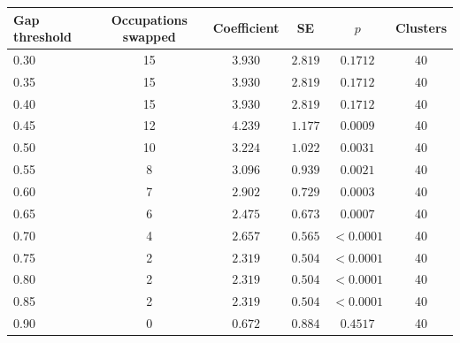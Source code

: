 \begin{tabular}{lccccc}
\toprule
Gap threshold & Occupations swapped & Coefficient & SE & $p$ & Clusters \\
\midrule
0.30 & 15 & $3.930$ & $2.819$ & $0.1712$ & 40 \\
0.35 & 15 & $3.930$ & $2.819$ & $0.1712$ & 40 \\
0.40 & 15 & $3.930$ & $2.819$ & $0.1712$ & 40 \\
0.45 & 12 & $4.239$\sym{***} & $1.177$ & $0.0009$ & 40 \\
0.50 & 10 & $3.224$\sym{**} & $1.022$ & $0.0031$ & 40 \\
0.55 & 8 & $3.096$\sym{**} & $0.939$ & $0.0021$ & 40 \\
0.60 & 7 & $2.902$\sym{***} & $0.729$ & $0.0003$ & 40 \\
0.65 & 6 & $2.475$\sym{***} & $0.673$ & $0.0007$ & 40 \\
0.70 & 4 & $2.657$\sym{***} & $0.565$ & $<0.0001$ & 40 \\
0.75 & 2 & $2.319$\sym{***} & $0.504$ & $<0.0001$ & 40 \\
0.80 & 2 & $2.319$\sym{***} & $0.504$ & $<0.0001$ & 40 \\
0.85 & 2 & $2.319$\sym{***} & $0.504$ & $<0.0001$ & 40 \\
0.90 & 0 & $0.672$ & $0.884$ & $0.4517$ & 40 \\
\bottomrule
\end{tabular}
